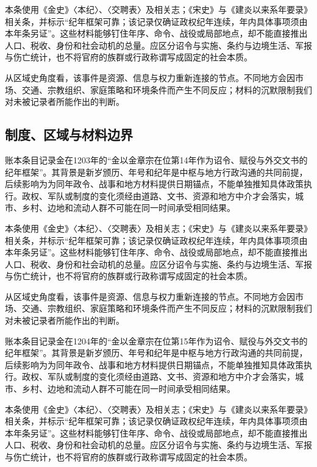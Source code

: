 本条使用《金史》〈本纪〉、〈交聘表〉及相关志；《宋史》与《建炎以来系年要录》相关条，并标示“纪年框架可靠；该记录仅确证政权纪年连续，年内具体事项须由本年条另证”。这些材料能够钉住年序、命令、战役或局部地点，却不能直接推出人口、税收、身份和社会动机的总量。应区分诏令与实施、条约与边境生活、军报与伤亡统计，也不将官府的族群或行政称谓写成固定的社会本质。

从区域史角度看，该事件是资源、信息与权力重新连接的节点。不同地方会因市场、交通、宗教组织、家庭策略和环境条件而产生不同反应；材料的沉默限制我们对未被记录者所能作出的判断。

\subsection{制度、区域与材料边界}

账本条目记录金在1203年的“金以金章宗在位第14年作为诏令、赋役与外交文书的纪年框架”。其背景是新岁颁历、年号和纪年是中枢与地方行政沟通的共同前提，后续影响为为同年政令、战事和地方材料提供日期锚点，不能单独推知具体政策执行。政权、军队或制度的变化须经由道路、文书、资源和地方中介才会落实，城市、乡村、边地和流动人群不可能在同一时间承受相同结果。

本条使用《金史》〈本纪〉、〈交聘表〉及相关志；《宋史》与《建炎以来系年要录》相关条，并标示“纪年框架可靠；该记录仅确证政权纪年连续，年内具体事项须由本年条另证”。这些材料能够钉住年序、命令、战役或局部地点，却不能直接推出人口、税收、身份和社会动机的总量。应区分诏令与实施、条约与边境生活、军报与伤亡统计，也不将官府的族群或行政称谓写成固定的社会本质。

从区域史角度看，该事件是资源、信息与权力重新连接的节点。不同地方会因市场、交通、宗教组织、家庭策略和环境条件而产生不同反应；材料的沉默限制我们对未被记录者所能作出的判断。

账本条目记录金在1204年的“金以金章宗在位第15年作为诏令、赋役与外交文书的纪年框架”。其背景是新岁颁历、年号和纪年是中枢与地方行政沟通的共同前提，后续影响为为同年政令、战事和地方材料提供日期锚点，不能单独推知具体政策执行。政权、军队或制度的变化须经由道路、文书、资源和地方中介才会落实，城市、乡村、边地和流动人群不可能在同一时间承受相同结果。

本条使用《金史》〈本纪〉、〈交聘表〉及相关志；《宋史》与《建炎以来系年要录》相关条，并标示“纪年框架可靠；该记录仅确证政权纪年连续，年内具体事项须由本年条另证”。这些材料能够钉住年序、命令、战役或局部地点，却不能直接推出人口、税收、身份和社会动机的总量。应区分诏令与实施、条约与边境生活、军报与伤亡统计，也不将官府的族群或行政称谓写成固定的社会本质。

